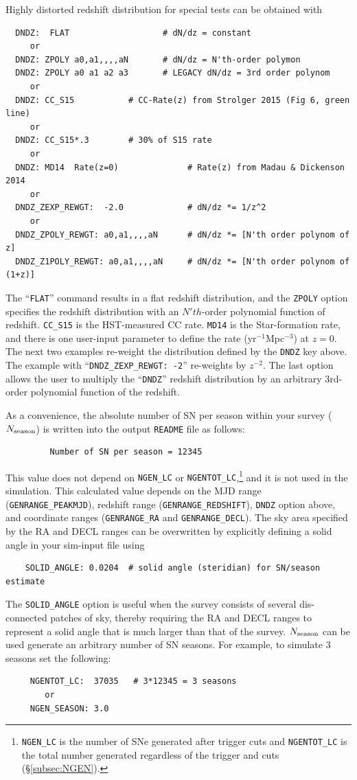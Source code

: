 \documentclass[12pt]{article}
\newcommand{\Nseason}{N_{\rm season}}
\begin{document}
\bigskip
Highly distorted redshift distribution for special tests
can be obtained with
%
\begin{verbatim}
  DNDZ:  FLAT                   # dN/dz = constant
     or
  DNDZ: ZPOLY a0,a1,,,,aN       # dN/dz = N'th-order polymon
  DNDZ: ZPOLY a0 a1 a2 a3       # LEGACY dN/dz = 3rd order polynom
     or
  DNDZ: CC_S15           # CC-Rate(z) from Strolger 2015 (Fig 6, green line)
     or
  DNDZ: CC_S15*.3        # 30% of S15 rate
     or
  DNDZ: MD14  Rate(z=0)              # Rate(z) from Madau & Dickenson 2014  
     or
  DNDZ_ZEXP_REWGT:  -2.0             # dN/dz *= 1/z^2
     or
  DNDZ_ZPOLY_REWGT: a0,a1,,,,aN      # dN/dz *= [N'th order polynom of z]
  DNDZ_Z1POLY_REWGT: a0,a1,,,,aN     # dN/dz *= [N'th order polynom of (1+z)] 
\end{verbatim}
%
The ``{\tt FLAT}'' command results in a flat redshift distribution,
and the {\tt ZPOLY} option specifies the redshift distribution with
an $N'th$-order polynomial function of redshift.
{\tt CC\_S15} is the HST-measured CC rate.
{\tt MD14} is the Star-formation rate, and there is one user-input 
parameter to define the rate (yr$^{-1}$Mpc$^{-3}$) at $z=0$.
The next two examples re-weight the distribution defined
by the {\tt DNDZ} key above.
The example with ``{\tt DNDZ\_ZEXP\_REWGT: -2}'' re-weights
by $z^{-2}$.
The last option allows the user to multiply the ``{\tt DNDZ}''
redshift distribution by an arbitrary 3rd-order polynomial
function of the redshift.

As a convenience, the absolute number of SN per season within your survey
($\Nseason$) is written into the output {\tt README} file as follows:
%
\begin{verbatim}
         Number of SN per season = 12345
\end{verbatim}
%
This value does not depend on 
{\tt NGEN\_LC} or {\tt NGENTOT\_LC},\footnote{
{\tt NGEN\_LC} is the number of SNe generated after trigger cuts and
{\tt NGENTOT\_LC} is the total number generated regardless of the
trigger and cuts (\S\ref{subsec:NGEN}).
} %
and it is not used in the simulation.
This calculated value depends on the
MJD range ({\tt GENRANGE\_PEAKMJD}),
redshift range ({\tt GENRANGE\_REDSHIFT}),
{\tt DNDZ} option above,
and coordinate ranges ({\tt GENRANGE\_RA} and {\tt GENRANGE\_DECL}).
The sky area specified by the RA and DECL ranges can be overwritten
by explicitly defining a solid angle in your sim-input file using
\begin{verbatim}
    SOLID_ANGLE: 0.0204  # solid angle (steridian) for SN/season estimate
\end{verbatim}
The {\tt SOLID\_ANGLE} option is useful when the survey consists
of several dis-connected patches of sky, thereby requiring the
RA and DECL ranges to represent a solid  angle that is much larger
than that of the survey.
%
$\Nseason$ can be used generate an arbitrary number of SN seasons. 
For example, to simulate 3 seasons set the following:
\begin{verbatim}
     NGENTOT_LC:  37035   # 3*12345 = 3 seasons
        or
     NGEN_SEASON: 3.0
\end{verbatim}
\end{document}
